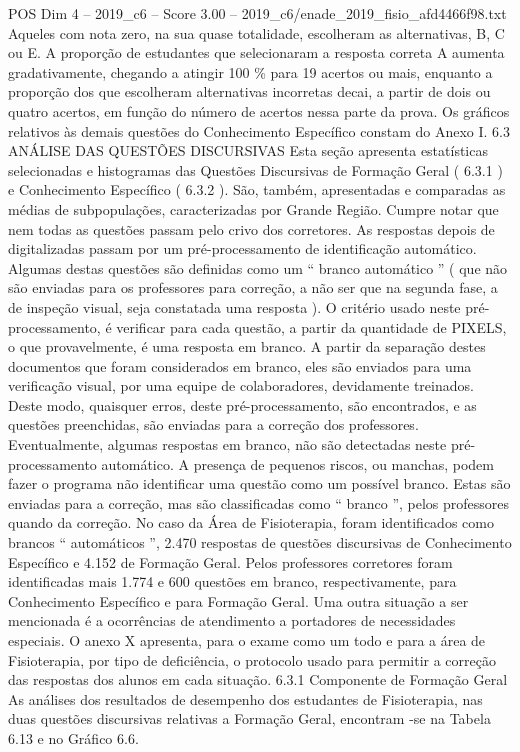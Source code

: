 \begin{textsample}{POS Dim 4 – 2019\_c6 – Score 3.00 – 2019\_c6/enade\_2019\_fisio\_afd4466f98.txt}
Aqueles com nota zero, na sua quase totalidade, escolheram as alternativas, B, C ou E.
A proporção de estudantes que selecionaram a resposta correta A aumenta gradativamente, chegando a atingir 100 \% para 19 acertos ou mais, enquanto a proporção dos que escolheram alternativas incorretas decai, a partir de dois ou quatro acertos, em função do número de acertos nessa parte da prova.
Os gráficos relativos às demais questões do Conhecimento Específico constam do Anexo I. 6.3 ANÁLISE DAS QUESTÕES DISCURSIVAS Esta seção apresenta estatísticas selecionadas e histogramas das Questões Discursivas de Formação Geral ( 6.3.1 ) e Conhecimento Específico ( 6.3.2 ).
São, também, apresentadas e comparadas as médias de subpopulações, caracterizadas por Grande Região.
Cumpre notar que nem todas as questões passam pelo crivo dos corretores.
As respostas depois de digitalizadas passam por um pré-processamento de identificação automático.
Algumas destas questões são definidas como um “ branco automático ” ( que não são enviadas para os professores para correção, a não ser que na segunda fase, a de inspeção visual, seja constatada uma resposta ).
O critério usado neste pré-processamento, é verificar para cada questão, a partir da quantidade de PIXELS, o que provavelmente, é uma resposta em branco.
A partir da separação destes documentos que foram considerados em branco, eles são enviados para uma verificação visual, por uma equipe de colaboradores, devidamente treinados.
Deste modo, quaisquer erros, deste pré-processamento, são encontrados, e as questões preenchidas, são enviadas para a correção dos professores.
Eventualmente, algumas respostas em branco, não são detectadas neste pré-processamento automático.
A presença de pequenos riscos, ou manchas, podem fazer o programa não identificar uma questão como um possível branco.
Estas são enviadas para a correção, mas são classificadas como “ branco ”, pelos professores quando da correção.
No caso da Área de Fisioterapia, foram identificados como brancos “ automáticos ”, 2.470 respostas de questões discursivas de Conhecimento Específico e 4.152 de Formação Geral.
Pelos professores corretores foram identificadas mais 1.774 e 600 questões em branco, respectivamente, para Conhecimento Específico e para Formação Geral.
Uma outra situação a ser mencionada é a ocorrências de atendimento a portadores de necessidades especiais.
O anexo X apresenta, para o exame como um todo e para a área de Fisioterapia, por tipo de deficiência, o protocolo usado para permitir a correção das respostas dos alunos em cada situação. 6.3.1 Componente de Formação Geral As análises dos resultados de desempenho dos estudantes de Fisioterapia, nas duas questões discursivas relativas a Formação Geral, encontram -se na Tabela 6.13 e no Gráfico 6.6.

\end{textsample}
